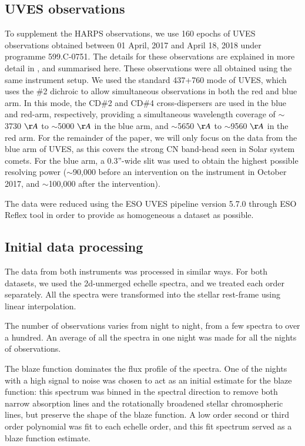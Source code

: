 \documentclass{aa}
\begin{document}
\subsection{UVES observations}
To supplement the HARPS observations, we use 160 epochs of UVES observations obtained between 01 April, 2017 and April 18, 2018 under programme 599.C-0751.
%
The details for these observations are explained in more detail in \cite{vansluijs2019}, and summarised here.
%
These observations were all obtained using the same instrument setup.
%
We used the standard 437+760 mode of UVES, which uses the \#2 dichroic to allow simultaneous observations in both the red and blue arm.
%
In this mode, the CD\#2 and CD\#4 cross-dispersers are used in the blue and red-arm, respectively, providing a simultaneous wavelength coverage of $\sim$3730 $\AA$  to $\sim$5000 $\AA$ in the blue arm, and $\sim$5650 $\AA$ to $\sim$9560 $\AA$ in the red arm.
%
For the remainder of the paper, we will only focus on the data from the blue arm of UVES, as this covers the strong CN band-head seen in Solar system comets.
%
For the blue arm, a 0.3''-wide slit was used to obtain the highest possible resolving power ($\sim$90,000 before an intervention on the instrument in October 2017, and $\sim$100,000 after the intervention). 

The data were reduced using the ESO UVES pipeline version 5.7.0 through ESO Reflex tool in order to provide as homogeneous a dataset as possible. 

\subsection{Initial data processing}
The data from both instruments was processed in similar ways.
%
For both datasets, we used the 2d-unmerged echelle spectra, and we treated each order separately.
%
All the spectra were transformed into the stellar rest-frame using linear interpolation. 

The number of observations varies from night to night, from a few spectra to over a hundred.
%
An average of all the spectra in one night was made for all the nights of observations.


The blaze function dominates the flux profile of the spectra.
%
One of the nights with a high signal to noise was chosen to act as an initial estimate for the blaze function: this spectrum was binned in the spectral direction to remove both narrow absorption lines and the rotationally broadened stellar chromospheric lines, but preserve the shape of the blaze function.
%
A low order second or third order polynomial was fit to each echelle order, and this fit spectrum served as a blaze function estimate. 
\end{document}
